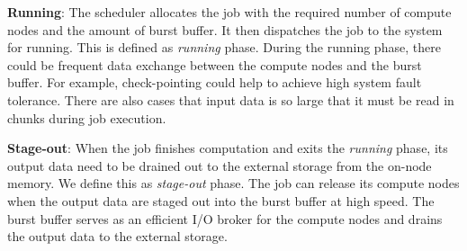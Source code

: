 \textbf{Running}: The scheduler allocates the job with the required
         number of compute nodes and the amount of burst buffer. 
         It then dispatches the job to the system for running.
         This is defined as \textit{running} phase.
         During the running phase, there could be frequent data exchange
         between the compute nodes and the burst buffer.
         For example, check-pointing could help to achieve high system fault tolerance.
         There are also cases that input data is so large that it must be read in
         chunks during job execution.
 
\textbf{Stage-out}: When the job finishes computation and
         exits the \textit{running} phase, its output data need to be drained out
         to the external storage from the on-node memory. We define this as \textit{stage-out} phase.
         The job can release its compute nodes when the output data are staged out
         into the burst buffer at high speed. The burst buffer serves as an efficient
         I/O broker for the compute nodes and drains the output data to the external storage.





